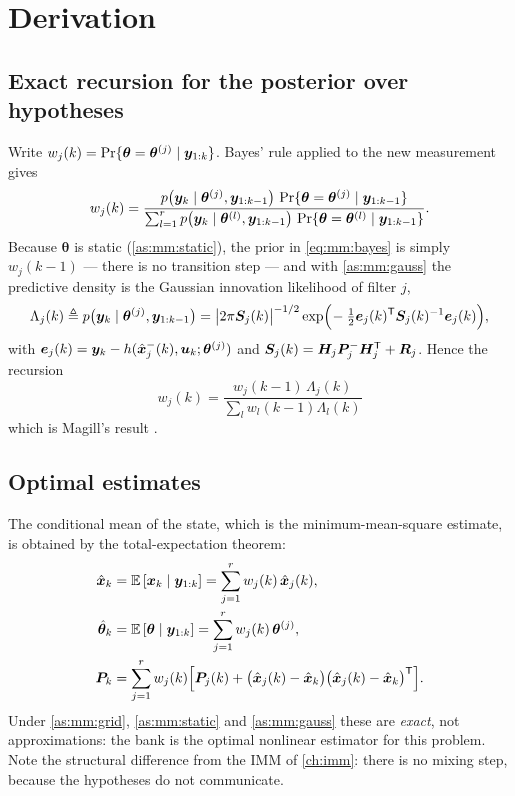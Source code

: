 \section{Derivation}

\subsection{Exact recursion for the posterior over hypotheses}
Write $w_j(k) = \mathrm{Pr}\{\bm\theta=\bm\theta^{(j)}\mid\bm{y}_{1:k}\}$.  Bayes' rule applied to the
new measurement gives
\begin{equation}
w_j(k) = \frac{p\big(\vy_k\mid\bm\theta^{(j)},\vy_{1:k-1}\big)\ \mathrm{Pr}\{\bm\theta=\bm\theta^{(j)}\mid\vy_{1:k-1}\}}
              {\sum_{l=1}^{r} p\big(\vy_k\mid\bm\theta^{(l)},\vy_{1:k-1}\big)\ \mathrm{Pr}\{\bm\theta=\bm\theta^{(l)}\mid\vy_{1:k-1}\}} .
\label{eq:mm:bayes}
\end{equation}
Because $\bm\theta$ is static (\cref{as:mm:static}), the prior in \eqref{eq:mm:bayes} is simply
$w_j(k-1)$ --- there is no transition step --- and with \cref{as:mm:gauss} the predictive density is
the Gaussian innovation likelihood of filter $j$,
\begin{equation}
\Lambda_j(k) \triangleq p\big(\bm{y}_k\mid\bm\theta^{(j)},\bm{y}_{1:k-1}\big)
= \big|2\pi\bm{S}_j(k)\big|^{-1/2}\exp\!\Big(\!-\tfrac12\bm{e}_j(k)^{\mathsf{T}}\bm{S}_j(k)^{-1}\bm{e}_j(k)\Big),
\label{eq:mm:lik}
\end{equation}
with $\bm{e}_j(k)=\bm{y}_k-h(\hat{\bm{x}}^{-}_j(k),\bm{u}_k;\bm\theta^{(j)})$ and
$\bm{S}_j(k)=\bm{H}_j\bm{P}^{-}_j\bm{H}_j^{\mathsf{T}}+\bm{R}_j$.  Hence the recursion
\begin{equation}
\boxed{\;w_j(k) = \frac{w_j(k-1)\,\Lambda_j(k)}{\sum_{l}w_l(k-1)\Lambda_l(k)}\;}
\label{eq:mm:w}
\end{equation}
which is Magill's result \cite{magill1965mmae}.

\subsection{Optimal estimates}
The conditional mean of the state, which is the minimum-mean-square estimate, is obtained by the
total-expectation theorem:
\begin{align}
\hat{\bm{x}}_k &= \mathbb{E}\left[\bm{x}_k\mid\bm{y}_{1:k}\right] = \sum_{j=1}^{r} w_j(k)\,\hat{\bm{x}}_j(k), \label{eq:mm:x}\\
\hat{\bm\theta}_k &= \mathbb{E}\left[\bm\theta\mid\bm{y}_{1:k}\right] = \sum_{j=1}^{r} w_j(k)\,\bm\theta^{(j)}, \label{eq:mm:theta}\\
\bm{P}_k &= \sum_{j=1}^{r} w_j(k)\Big[\bm{P}_j(k) + \big(\hat{\bm{x}}_j(k)-\hat{\bm{x}}_k\big)\big(\hat{\bm{x}}_j(k)-\hat{\bm{x}}_k\big)^{\mathsf{T}}\Big].
\label{eq:mm:P}
\end{align}
Under \cref{as:mm:grid}, \cref{as:mm:static} and \cref{as:mm:gauss} these are \emph{exact}, not approximations: the
bank is the optimal nonlinear estimator for this problem.  Note the structural difference from the
IMM of \cref{ch:imm}: there is no mixing step, because the hypotheses do not communicate.

